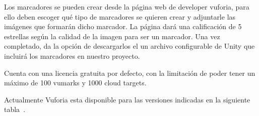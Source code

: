 
Los marcadores se pueden crear desde la página web de developer vuforia, para ello deben escoger qué tipo de marcadores se quieren crear y adjuntarle las imágenes que formarán dicho marcador. La página dará una calificación de 5 estrellas según la calidad de la imagen para ser un marcador. Una vez completado, da la opción de descargarlos el un archivo configurable de Unity que incluirá los marcadores en nuestro proyecto.



Cuenta con una licencia gratuita por defecto, con la limitación de poder tener un máximo de 100 vumarks y 1000 cloud targets.

Actualmente Vuforia esta disponible para las versiones indicadas en la siguiente tabla~\cite{vuforia_supported_versions}.

